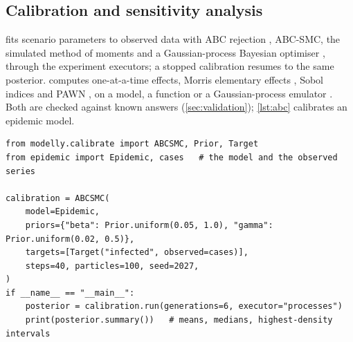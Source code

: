 \subsection{Calibration and sensitivity analysis}

 fits scenario parameters to observed data with ABC rejection
\citep{beaumont2002approximate}, ABC-SMC, the simulated method of moments
\citep{mcfadden1989method} and a Gaussian-process Bayesian optimiser \citep{jones1998efficient}, through
the experiment executors; a stopped calibration resumes to the same posterior.
 computes one-at-a-time effects, Morris elementary effects
\citep{morris1991factorial}, Sobol indices and PAWN \citep{pianosi2018distribution}, on a
model, a function or a Gaussian-process emulator \citep{oakley2004probabilistic}. Both are checked against known answers
(\cref{sec:validation}); \cref{lst:abc} calibrates an epidemic model.

\begin{lstlisting}[float=tp,caption={ABC-SMC calibration of two rates of an epidemic model to an observed series.
\code{epidemic} is the model module of \code{docs/calibration.md}, the documented SIR model
with its observed series \code{cases}; run as printed against that module, the listing
gives the posterior quoted in \cref{sec:validation} (\code{paper/scripts/check\_listings.py}).},
label={lst:abc}]
from modelly.calibrate import ABCSMC, Prior, Target
from epidemic import Epidemic, cases   # the model and the observed series

calibration = ABCSMC(
    model=Epidemic,
    priors={"beta": Prior.uniform(0.05, 1.0), "gamma": Prior.uniform(0.02, 0.5)},
    targets=[Target("infected", observed=cases)],
    steps=40, particles=100, seed=2027,
)
if __name__ == "__main__":
    posterior = calibration.run(generations=6, executor="processes")
    print(posterior.summary())   # means, medians, highest-density intervals
\end{lstlisting}

